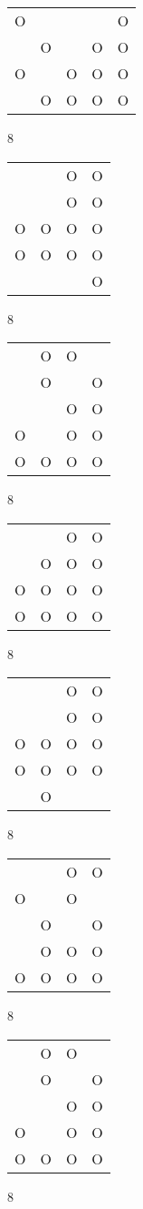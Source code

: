 \begin{tabular}{|m{0.2cm}m{0.2cm}m{0.2cm}m{0.2cm}m{0.2cm}|}\hline
O& & & &O\\
 &O& &O&O\\
O& &O&O&O\\
 &O&O&O&O\\
\hline\end{tabular}8
\begin{tabular}{|m{0.2cm}m{0.2cm}m{0.2cm}m{0.2cm}|}\hline
 & &O&O\\
 & &O&O\\
O&O&O&O\\
O&O&O&O\\
 & & &O\\
\hline\end{tabular}8
\begin{tabular}{|m{0.2cm}m{0.2cm}m{0.2cm}m{0.2cm}|}\hline
 &O&O& \\
 &O& &O\\
 & &O&O\\
O& &O&O\\
O&O&O&O\\
\hline\end{tabular}8
\begin{tabular}{|m{0.2cm}m{0.2cm}m{0.2cm}m{0.2cm}|}\hline
 & &O&O\\
 &O&O&O\\
O&O&O&O\\
O&O&O&O\\
\hline\end{tabular}8
\begin{tabular}{|m{0.2cm}m{0.2cm}m{0.2cm}m{0.2cm}|}\hline
 & &O&O\\
 & &O&O\\
O&O&O&O\\
O&O&O&O\\
 &O& & \\
\hline\end{tabular}8
\begin{tabular}{|m{0.2cm}m{0.2cm}m{0.2cm}m{0.2cm}|}\hline
 & &O&O\\
O& &O& \\
 &O& &O\\
 &O&O&O\\
O&O&O&O\\
\hline\end{tabular}8
\begin{tabular}{|m{0.2cm}m{0.2cm}m{0.2cm}m{0.2cm}|}\hline
 &O&O& \\
 &O& &O\\
 & &O&O\\
O& &O&O\\
O&O&O&O\\
\hline\end{tabular}8
